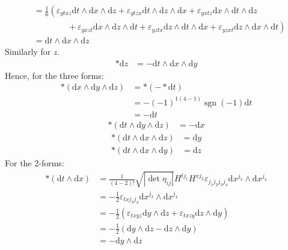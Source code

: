 \documentclass[12pt,a4]{article}
\DeclareMathOperator{\sign}{sgn}
\newcommand{\e}{\mathrm{d}}
\begin{document}
\begin{enumerate}
\begin{enumerate}
\begin{align*}
                 &= \frac{1}{6}  \left(\varepsilon_{y t x z} \e t \wedge \e x \wedge \e z + \varepsilon_{y t z x} \e t \wedge \e z \wedge \e x + \varepsilon_{y x t z} \e x \wedge \e t \wedge \e z\right.\\
                 &\qquad \qquad +\left. \varepsilon_{y x z t} \e x \wedge \e z \wedge \e t + \varepsilon_{y z t x} \e z \wedge \e t \wedge \e x + \varepsilon_{y z x t} \e z \wedge \e x \wedge \e t\right)\\
                 &=  \e t \wedge \e x \wedge \e z
        \end{align*}
        Similarly for $z$.
        \begin{align*}
          *\e z
                 &=  - \e t \wedge \e x \wedge \e y
        \end{align*}
        Hence, for the three forms:
        \begin{align*}
          *(\e x \wedge \e y \wedge \e z) 
            &= *(- *\e t)\\
            &= - (-1)^{1(4 - 1)} \sign(-1) \e t\\
            &= - \e t
        \end{align*}
        \begin{align*}
          *(\e t \wedge \e y \wedge \e z) 
            &= - \e x
        \end{align*}
        \begin{align*}
          *(\e t \wedge \e x \wedge \e z) 
            &= \e y
        \end{align*}
        \begin{align*}
          *(\e t \wedge \e x \wedge \e y) 
            &= \e z
        \end{align*}
        For the 2-forms:
        \begin{align*}
          *(\e t \wedge \e x)
                 &= \frac{1}{(4 - 2)!} \sqrt{|\det{\eta_{ij}}|} H^{t j_1} H^{x j_2} \varepsilon_{j_1 j_2 j_3 j_4} \e x^{j_3} \wedge \e x^{j_4}\\
                 &= - \frac{1}{2} \varepsilon_{t x j_3 j_4} \e x^{j_3} \wedge \e x^{j_4}\\
                 &= - \frac{1}{2} \left(\varepsilon_{t x y z} \e y \wedge \e  z + \varepsilon_{t x z y} \e z \wedge \e y\right)\\
                 &= - \frac{1}{2} \left( \e y \wedge \e  z - \e z \wedge \e y\right)\\
                 &= - \e y \wedge \e  z 
        \end{align*}

\end{enumerate}
\end{enumerate}
\end{document}
